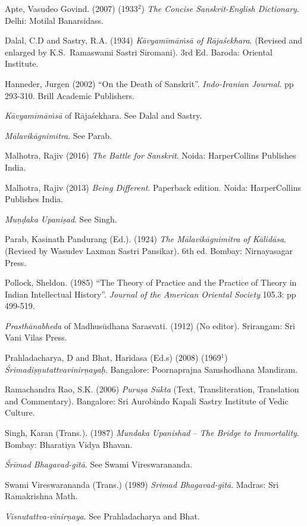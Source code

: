 \begin{thebibliography}{99}
\itemsep=2pt
Apte, Vasudeo Govind. (2007) (1933$^{2}$) {\sl The Concise Sanskrit-English Dictionary}. Delhi: Motilal Banarsidass.

Dalal, C.D and Sastry, R.A. (1934) {\sl Kāvyamīmāṁsā of Rājaśekhara}. (Revised and enlarged by K.S.~Ramaswami Sastri Siromani). 3rd Ed. Baroda: Oriental Institute.

Hanneder, Jurgen (2002) ``On the Death of Sanskrit''. {\sl Indo-Iranian Journal}. pp 293-310. Brill Academic Publishers. 

{\sl Kāvyamīmāṁsā} of Rājaśekhara. See Dalal and Sastry. 

{\sl Mālavikāgnimitra}. See Parab. 

Malhotra, Rajiv (2016) {\sl The Battle for Sanskrit}. Noida: HarperCollins Publishes India.

Malhotra, Rajiv (2013) {\sl Being Different}. Paperback edition. Noida: HarperCollins Publishes India.

{\sl Muṇḍaka Upaniṣad}. See Singh. 

Parab, Kasinath Pandurang (Ed.). (1924) {\sl The Mālavikāgnimitra of Kālidāsa}. (Revised by Wasudev Laxman Sastri Pansikar). 6th ed. Bombay: Nirnayasagar Press.

Pollock, Sheldon. (1985) ``The Theory of Practice and the Practice of Theory in Indian Intellectual History''. {\sl Journal of the American Oriental Society} 105.3: pp 499-519.

{\sl Prasthānabheda} of Madhusūdhana Sarasvati. (1912) (No editor). Srirangam: Sri Vani Vilas Press.

Prahladacharya, D and Bhat, Haridasa (Ed.s) (2008) (1969$^{1}$) {\sl Śrimadiṣṇutattvavinirṇayaḥ}. Bangalore: Poornaprajna Samshodhana Mandiram.

Ramachandra Rao, S.K. (2006) {\sl Puruṣa Sūkta} (Text, Transliteration, Translation and Commentary). Bangalore: Sri Aurobindo Kapali Sastry Institute of Vedic Culture. 

Singh, Karan (Trans.). (1987) {\sl Mundaka Upanishad} -- {\sl The Bridge to Immortality}. Bombay: Bharatiya Vidya Bhavan.

{\sl Śrīmad Bhagavad-gītā}. See Swami Vireswarananda. 

Swami Vireswarananda (Trans.) (1989) {\sl Srimad Bhagavad-gītā}. Madras: Sri Ramakrishna Math.

{\sl Visnutattva-vinirṇaya}. See Prahladacharya and Bhat.
\end{thebibliography}
